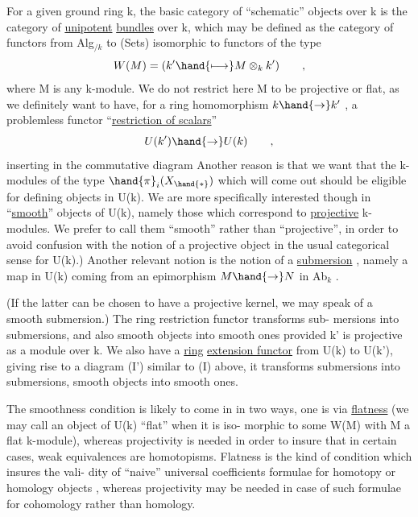 
For a given ground ring k,  the basic category of ``schematic'' objects
over k is the category of \uline{unipotent} \uline{bundles} over k,  which may be defined
as the category of  functors  from Alg$_{/k}$ to  (Sets)
isomorphic to functors of the type
\[ W(M) = ( k' \hand{\longmapsto} M\otimes_k k' ) \qquad , \]
where M is any k-module.  We do not restrict here M to be projective or
flat,  as we definitely want to have,  for a ring homomorphism $k \hand{\to} k'$ ,
a problemless functor  ``\uline{restriction of scalars}''
\[ U(k') \hand{\to} U(k) \qquad , \]
inserting in the commutative diagram
Another reason is that we want that the k-modules of the type $\hand{\pi}_i(X_{\hand{*}})$
which will come out should be eligible for defining objects in U(k).
We are more specifically interested though in ``\uline{smooth}'' objects of U(k),
namely those which correspond to \uline{projective} k-modules.  \hand{(}We prefer to
call them ``smooth'' rather than ``projective'', in order to avoid confusion
with the notion of a projective object in the usual categorical sense
for U(k).)\hand{\unsure{)}}  Another relevant notion is the notion of a \uline{submersion} ,
namely a map in U(k)  coming from an epimorphism  $M \hand{\to} N$  in Ab$_k$ .

(If the latter can be chosen to have a projective kernel,  we may speak
of a smooth submersion.)  The ring restriction functor transforms sub-%
mersions into submersions,  and also smooth objects into smooth ones
provided k' is projective as a module over k.    We also have a \uline{ring}
\uline{extension functor} from U(k) to U(k'),  giving rise to a diagram (I')
similar to (I) above,  it transforms submersions into submersions,
smooth objects into smooth ones.

The smoothness condition is likely to come in in two ways,  one
is via \uline{flatness}  (we may call an object of U(k) ``flat'' when it is iso-%
morphic to some W(M) with M a flat k-module),  whereas projectivity is
needed in order to insure that in certain cases,  weak equivalences are
homotopisms.  Flatness is the kind of condition which insures the vali-%
dity of ``naive'' universal coefficients formulae for homotopy or homology
objects ,  whereas projectivity may be needed in case of such formulae
for cohomology rather than homology.

